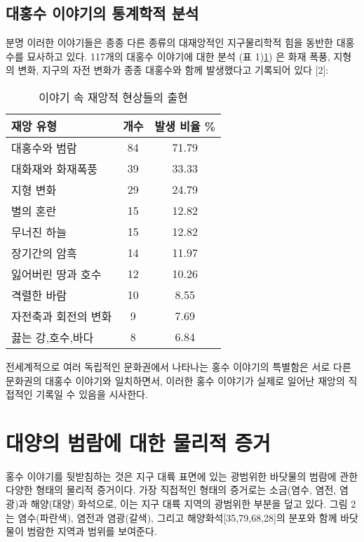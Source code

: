 \documentclass[10pt,twocolumn,letterpaper]{article}
\begin{document}
\subsection{대홍수 이야기의 통계학적 분석}

분명  이러한 이야기들은 종종 다른 종류의 대재앙적인 지구물리학적 힘을 동반한 대홍수를 묘사하고 있다. 117개의 대홍수 이야기에 대한 분석 (표 1)\ref{tab: 1}) 은 화재 폭풍, 지형의 변화, 지구의 자전 변화가 종종 대홍수와 함께 발생했다고 기록되어 있다 [2]\cite{14}:

\begin{table}[ht]
\begin{center}
\renewcommand{\arraystretch}{1.2}  
\begin{tabular}{|l|c|c|}
\hline
\textbf{재앙 유형} & \textbf{개수} & \textbf{발생 비율 \%} \\
\hline\hline
대홍수와 범람                   & 84 & 71.79 \\
대화재와 화재폭풍         & 39 & 33.33 \\
지형 변화               & 29 & 24.79 \\
별의 혼란               & 15 & 12.82 \\
무너진 하늘               & 15 & 12.82 \\
장기간의 암흑               & 14 & 11.97 \\
잃어버린 땅과 호수      & 12 & 10.26 \\
격렬한 바람           & 10 & 8.55  \\
자전축과 회전의 변화            & 9 & 7.69  \\
끓는 강,호수,바다       & 8 & 6.84 \\
\hline
\end{tabular}
\end{center}
\caption{이야기 속 재앙적 현상들의 출현 }
\label{tab: 1}
\end{table}

전세계적으로 여러 독립적인 문화권에서 나타나는 홍수 이야기의 특별함은  서로 다른 문화권의 대홍수 이야기와 일치하면서, 이러한 홍수 이야기가 실제로 일어난 재앙의 직접적인 기록일 수 있음을 시사한다.

\section{대양의 범람에 대한 물리적 증거}

홍수 이야기를 뒷받침하는 것은 지구 대륙 표면에 있는 광범위한 바닷물의 범람에 관한 다양한 형태의 물리적 증거이다. 가장 직접적인 형태의 증거로는  소금(염수, 염전, 염광)과 해양(대양) 화석으로, 이는 지구 대륙 지역의 광범위한 부분을 덮고 있다. 그림 2는 염수(파란색), 염전과 염광(갈색), 그리고 해양화석[35,79,68,28]의 분포와 함께 바닷물이 범람한 지역과 범위를 보여준다.
\end{document}

